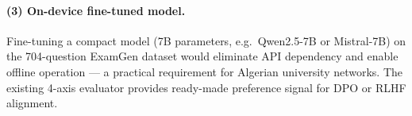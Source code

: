 \paragraph{(3) On-device fine-tuned model.}
Fine-tuning a compact model (7B parameters, e.g.\ Qwen2.5-7B or Mistral-7B)
on the 704-question ExamGen dataset would eliminate API dependency and enable
offline operation --- a practical requirement for Algerian university networks.
The existing 4-axis evaluator provides ready-made preference signal for
DPO or RLHF alignment.
